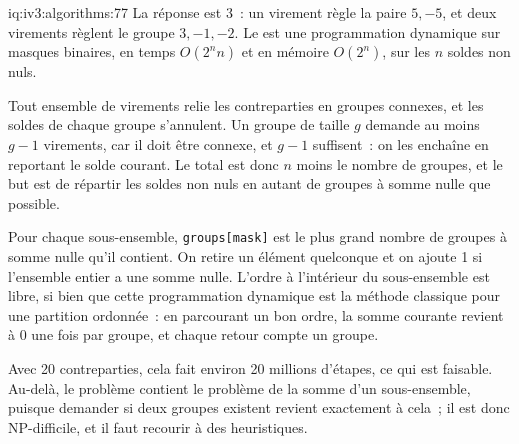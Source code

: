 \begin{solution}{iq:iv3:algorithms:77}
La réponse est 3~: un virement règle la paire $5, -5$, et deux virements règlent le groupe $3, -1, -2$. Le  est une programmation dynamique sur masques binaires, en temps $O(2^n n)$ et en mémoire $O(2^n)$, sur les $n$ soldes non nuls.
\label{lst:iv3:al:settle}

Tout ensemble de virements relie les contreparties en groupes connexes, et les soldes de chaque groupe s'annulent. Un groupe de taille $g$ demande au moins $g - 1$ virements, car il doit être connexe, et $g - 1$ suffisent~: on les enchaîne en reportant le solde courant. Le total est donc $n$ moins le nombre de groupes, et le but est de répartir les soldes non nuls en autant de groupes à somme nulle que possible.

Pour chaque sous-ensemble, \texttt{groups[mask]} est le plus grand nombre de groupes à somme nulle qu'il contient. On retire un élément quelconque et on ajoute 1 si l'ensemble entier a une somme nulle. L'ordre à l'intérieur du sous-ensemble est libre, si bien que cette programmation dynamique est la méthode classique pour une partition ordonnée~: en parcourant un bon ordre, la somme courante revient à 0 une fois par groupe, et chaque retour compte un groupe.

Avec 20 contreparties, cela fait environ 20 millions d'étapes, ce qui est faisable. Au-delà, le problème contient le problème de la somme d'un sous-ensemble, puisque demander si deux groupes existent revient exactement à cela~; il est donc NP-difficile, et il faut recourir à des heuristiques.

\end{solution}

